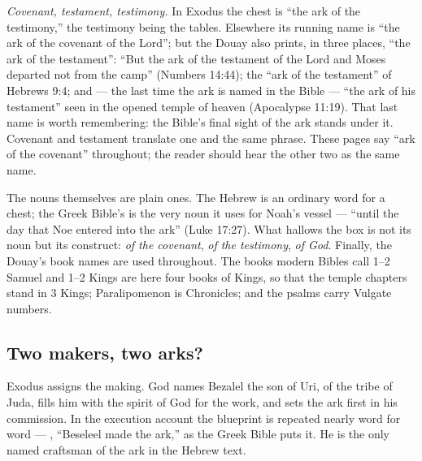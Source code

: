 \emph{Covenant, testament, testimony.} In Exodus the chest is ``the ark of
the testimony,'' the testimony being the tables. Elsewhere its running name
is ``the ark of the covenant of the Lord''; but the Douay also prints, in
three places, ``the ark of the testament'': ``But the ark of the testament
of the Lord and Moses departed not from the camp'' (Numbers 14:44); the
``ark of the testament'' of Hebrews 9:4; and --- the last time the ark is
named in the Bible --- ``the ark of his testament'' seen in the opened
temple of heaven (Apocalypse 11:19). That last name is worth remembering: the
Bible's final sight of the ark stands under it. Covenant and testament
translate one and the same phrase. These pages say ``ark of the covenant''
throughout; the reader should hear the other two as the same name.

The nouns themselves are plain ones. The Hebrew  is an ordinary
word for a chest; the Greek Bible's  is the very noun it uses
for Noah's vessel --- ``until the day that Noe entered into the ark'' (Luke
17:27). What hallows the box is not its noun but
its construct: \emph{of the covenant}, \emph{of the testimony}, \emph{of
God}. Finally, the Douay's book names are used throughout. The books modern
Bibles call 1--2 Samuel and 1--2 Kings are here four books of Kings, so
that the temple chapters stand in 3 Kings; Paralipomenon is Chronicles; and
the psalms carry Vulgate numbers.

\subsection{Two makers, two arks?}

Exodus assigns the making. God names Bezalel the son of Uri, of the tribe
of Juda, fills him with the spirit of God for the work, and sets the ark
first in his commission. In the execution account the blueprint is repeated
nearly word for word --- , ``Beseleel
made the ark,'' as the Greek Bible puts it. He is the only named craftsman
of the ark in the Hebrew text.

